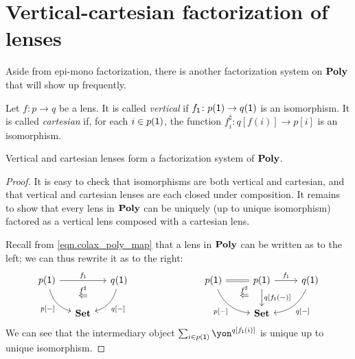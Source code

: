 \documentclass[Book-Poly]{subfiles}
\begin{document}
\section{Vertical-cartesian factorization of lenses}

Aside from epi-mono factorization, there is another factorization system on $\mathbf{Poly}$ that will show up frequently.

\begin{definition} \label{def.vert_cart}
Let $f\colon p\to q$ be a lens.
It is called \emph{vertical} if $f_{\textsf{1}}\colon p(\textsf{1})\to q(\textsf{1})$ is an isomorphism.
It is called \emph{cartesian} if, for each $i\in p(\textsf{1})$, the function $f^\sharp_i\colon q[f(i)]\to p[i]$ is an isomorphism.
\end{definition}

\begin{proposition}\label{prop.vert_cart_factorization}
Vertical and cartesian lenses form a factorization system of $\mathbf{Poly}$.
\end{proposition}
\begin{proof}
It is easy to check that isomorphisms are both vertical and cartesian, and that vertical and cartesian lenses are each closed under composition.
It remains to show that every lens in $\mathbf{Poly}$ can be uniquely (up to unique isomorphism) factored as a vertical lens composed with a cartesian lens.

Recall from \eqref{eqn.colax_poly_map} that a lens in $\mathbf{Poly}$ can be written as to the left; we can thus rewrite it as to the right:
\[
\begin{tikzcd}[column sep=small]
	p(\1)\ar[dr, bend right, "{p[-]}"']\ar[rr, "f_\1"]&~&
	q(\1)\ar[dl, bend left, "{q[-]}"]\\&
	\smset\ar[u, phantom, near end, "\overset{f^\sharp}{\Leftarrow}"]
\end{tikzcd}
\hspace{1in}
\begin{tikzcd}
	p(\1)\ar[dr, bend right, "{p[-]}"']\ar[r, equal, ""' name=equal]&
	p(\1)\ar[d, "{q[f_\1(-)]}"]\ar[r, "f_\1"]&
	q(\1)\ar[dl, bend left, "{q[-]}"]\\&
	|[alias=set]|\smset\ar[from=equal, to=set, pos=.3, phantom, "\overset{f^\sharp}{\Leftarrow}"]
\end{tikzcd}
\]
We can see that the intermediary object $\sum_{i\in p(\1)} \yon^{q[f_\1(i)]}$ is unique up to unique isomorphism.
\end{proof}
\end{document}
